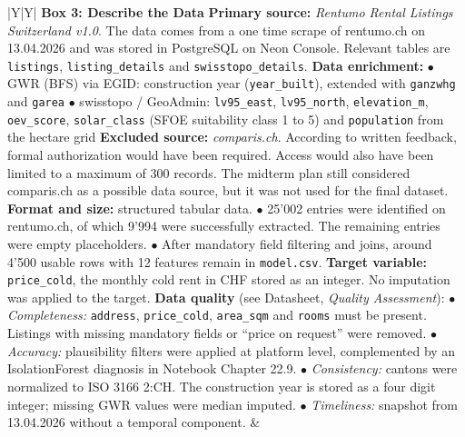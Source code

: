 \documentclass[11pt, a4paper]{article}
\begin{document}
{\begin{xltabular}{\textwidth}{|Y|Y|}
    \textbf{\color{accent}Box 3: Describe the Data} \newline
    \textbf{Primary source:} \emph{Rentumo Rental Listings Switzerland v1.0}. The data comes from a one time scrape of rentumo.ch on 13.04.2026 and was stored in PostgreSQL on Neon Console. Relevant tables are \texttt{listings}, \texttt{listing\_details} and \texttt{swisstopo\_details}.
    \newline\newline
    \textbf{Data enrichment:}
    \newline $\bullet$ GWR (BFS) via EGID: construction year (\texttt{year\_built}), extended with \texttt{ganzwhg} and \texttt{garea}
    \newline $\bullet$ swisstopo / GeoAdmin: \texttt{lv95\_east}, \texttt{lv95\_north}, \texttt{elevation\_m}, \texttt{oev\_score}, \texttt{solar\_class} (SFOE suitability class 1 to 5) and \texttt{population} from the hectare grid
    \newline\newline
    \textbf{Excluded source:} \emph{comparis.ch}. According to written feedback, formal authorization would have been required. Access would also have been limited to a maximum of 300 records. The midterm plan still considered comparis.ch as a possible data source, but it was not used for the final dataset.
    \newline\newline
    \textbf{Format and size:} structured tabular data.
    \newline $\bullet$ 25'002 entries were identified on rentumo.ch, of which 9'994 were successfully extracted. The remaining entries were empty placeholders.
    \newline $\bullet$ After mandatory field filtering and joins, around 4'500 usable rows with 12 features remain in \texttt{model.csv}.
    \newline\newline
    \textbf{Target variable:} \texttt{price\_cold}, the monthly cold rent in CHF stored as an integer. No imputation was applied to the target.
    \newline\newline
    \textbf{Data quality} (see Datasheet, \emph{Quality Assessment}):
    \newline $\bullet$ \emph{Completeness:} \texttt{address}, \texttt{price\_cold}, \texttt{area\_sqm} and \texttt{rooms} must be present. Listings with missing mandatory fields or ``price on request'' were removed.
    \newline $\bullet$ \emph{Accuracy:} plausibility filters were applied at platform level, complemented by an IsolationForest diagnosis in Notebook Chapter 22.9.
    \newline $\bullet$ \emph{Consistency:} cantons were normalized to ISO 3166 2:CH. The construction year is stored as a four digit integer; missing GWR values were median imputed.
    \newline $\bullet$ \emph{Timeliness:} snapshot from 13.04.2026 without a temporal component.
    &


\end{xltabular}}
\end{document}
